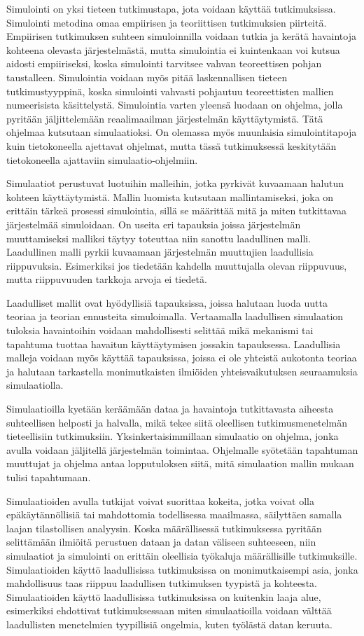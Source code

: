 \documentclass[utf8]{gradu3}
\begin{document}
Simulointi on yksi tieteen tutkimustapa, jota voidaan käyttää tutkimuksissa.
Simulointi metodina omaa empiirisen ja teoriittisen tutkimuksien piirteitä.
Empiirisen tutkimuksen suhteen simuloinnilla voidaan tutkia ja kerätä havaintoja
kohteena olevasta järjestelmästä, mutta simulointia ei 
kuintenkaan voi kutsua aidosti empiiriseksi,
koska simulointi tarvitsee vahvan teoreettisen pohjan taustalleen.
Simulointia voidaan myös pitää laskennallisen tieteen tutkimustyyppinä, 
koska simulointi vahvasti pohjautuu teoreettisten mallien numeerisista käsittelystä.
Simulointia varten yleensä luodaan on ohjelma, 
jolla pyritään jäljittelemään reaalimaailman järjestelmän käyttäytymistä.
Tätä ohjelmaa kutsutaan simulaatioksi.
On olemassa myös muunlaisia simulointitapoja kuin tietokoneella ajettavat ohjelmat, mutta 
tässä tutkimuksessä keskitytään tietokoneella ajattaviin simulaatio-ohjelmiin.

Simulaatiot perustuvat luotuihin malleihin, 
jotka pyrkivät kuvaamaan halutun kohteen käyttäytymistä. 
Mallin luomista kutsutaan mallintamiseksi, joka on erittäin tärkeä prosessi simulointia,
sillä se määrittää mitä ja miten tutkittavaa järjestelmää simuloidaan. 
On useita eri tapauksia joissa järjestelmän muuttamiseksi malliksi 
täytyy toteuttaa niin sanottu laadullinen malli. 
Laadullinen malli pyrkii kuvaamaan järjestelmän muuttujien laadullisia riippuvuksia.
Esimerkiksi jos tiedetään kahdella muuttujalla olevan riippuvuus, mutta riippuvuuden 
tarkkoja arvoja ei tiedetä.

Laadulliset mallit ovat hyödyllisiä tapauksissa, joissa halutaan luoda uutta teoriaa ja teorian ennusteita simuloimalla. Vertaamalla laadullisen simulaation tuloksia havaintoihin 
voidaan mahdollisesti selittää mikä mekanismi tai tapahtuma tuottaa havaitun käyttäytymisen jossakin tapauksessa.
Laadullisia malleja voidaan myös käyttää tapauksissa, joissa ei ole yhteistä aukotonta teoriaa ja halutaan tarkastella monimutkaisten ilmiöiden yhteisvaikutuksen seuraamuksia simulaatiolla.

Simulaatioilla kyetään keräämään dataa ja havaintoja tutkittavasta aiheesta suhteellisen helposti ja halvalla, mikä tekee siitä oleellisen tutkimusmenetelmän tieteellisiin tutkimuksiin. Yksinkertaisimmillaan simulaatio on ohjelma, jonka avulla voidaan jäljitellä järjestelmän toimintaa. Ohjelmalle syötetään tapahtuman muuttujat ja ohjelma antaa lopputuloksen siitä, mitä simulaation mallin mukaan tulisi tapahtumaan. 

Simulaatioiden avulla tutkijat voivat suorittaa kokeita, jotka voivat olla epäkäytännöllisiä tai mahdottomia todellisessa maailmassa, säilyttäen samalla laajan tilastollisen analyysin. Koska määrällisessä tutkimuksessa pyritään selittämään ilmiöitä perustuen dataan ja datan väliseen suhteeseen, niin simulaatiot ja simulointi on erittäin oleellisia työkaluja määrällisille tutkimuksille. 
Simulaatioiden käyttö laadullisissa tutkimuksissa on monimutkaisempi asia, 
jonka mahdollisuus taas riippuu laadullisen tutkimuksen tyypistä ja kohteesta. 
Simulaatioiden käyttö laadullisissa tutkimuksissa on kuitenkin laaja alue, 
esimerkiksi \textcite{eldabi2002quantitative} ehdottivat tutkimuksessaan miten simulaatioilla voidaan välttää laadullisten menetelmien tyypillisiä ongelmia, kuten työlästä datan keruuta. 
\end{document}
